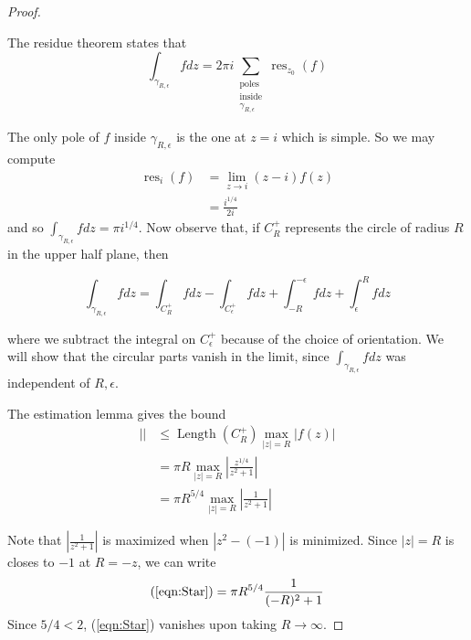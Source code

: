\documentclass{article}
\DeclareMathOperator{\res}{res}
\DeclareMathOperator{\Length}{Length}
\begin{document}
\begin{enumerate}
\begin{proof}
\begin{center}
		\end{center}
	
	The residue theorem states that 
	\[ \int_{\gamma_{R,\epsilon}} f dz = 2\pi i \sum_{\substack{\text{poles}\\\text{inside}\\ \gamma_{R,\epsilon}}} \res_{z_0}(f) \]
	
	The only pole of $f$ inside $\gamma_{R,\epsilon}$ is the one at $z=i$ which is simple. So we may compute
	\begin{align*}
		\res_i (f) &= \lim_{z \rightarrow i} (z-i) f(z) \\
		&= \frac{i^{1/4}}{2i}
	\end{align*}
	and so $\int_{\gamma_{R,\epsilon}} f dz = \pi i^{1/4}$. Now observe that, if $C_R^+$ represents the 
	circle of radius $R$ in the upper half plane, then 
	
	\[\int_{\gamma_{R,\epsilon}} f dz = \int_{C_R^+} f dz - \int_{C_\epsilon^+} f dz + \int_{-R}^{-\epsilon} f dz + \int_\epsilon^R f dz \]
	
	where we subtract the integral on $C_\epsilon^+$ because of the choice of orientation.
	We will show that the circular parts vanish in the limit, since $\int_{\gamma_{R,\epsilon}} f dz$ was independent of $R,\epsilon.$
	
	The estimation lemma gives the bound
	\begin{align}
		\left | \right | & \leq \Length(C^+_R) \max_{|z| = R} |f(z)| \nonumber\\
		&= \pi R \max_{|z| = R} \left | \frac{z^{1/4}}{z^2+1} \right | \nonumber\\
		&= \pi R^{5/4} \max_{|z| = R} \left | \frac{1}{z^2+1} \right | \label{eqn:Star}
	\end{align}
	
	Note that $\left | \frac{1}{z^2+1} \right |$ is maximized when $|z^2 - (-1)|$ is minimized.
	Since $|z| = R$ is closes to $-1$ at $R = -z$, we can write
	\[ (\ref{eqn:Star}) = \pi R^{5/4} \frac{1}{(-R)^2 + 1} \]
	Since $5/4 < 2$, (\ref{eqn:Star}) vanishes upon taking $R \rightarrow \infty$.
	

\end{proof}
\end{enumerate}
\end{document}

